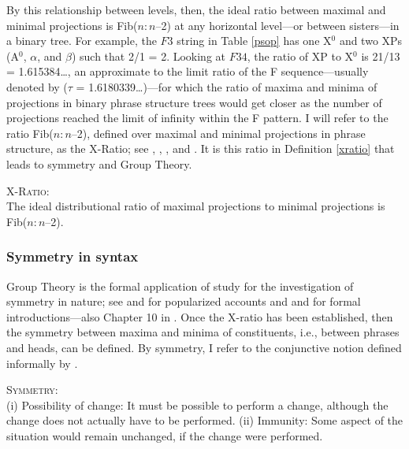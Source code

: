 \documentclass[11pt,twoside]{article}
\begin{document}
By this relationship between levels, then, the ideal ratio between maximal and minimal projections is Fib($n : n$--2) at any horizontal level---or between sisters---in a binary tree. For example, the $F3$ string in Table \ref{psop} has one X$^{0}$ and two XPs (A$^{0}$, $\alpha$, and $\beta$) such that 2/1 = 2. Looking at $F34$, the  ratio of XP to X$^{0}$ is 21/13 = 1.615384\dots, an approximate to the limit ratio of the F sequence---usually denoted by ($\tau$ = 1.6180339\dots)---for which the ratio of maxima and minima of projections in binary phrase structure trees would get closer as the number of projections reached the limit of infinity within the F pattern. I will refer to the ratio Fib($n : n$--2), defined over maximal and minimal projections in phrase structure, as the X-Ratio; see \cite{cm:2005}, \cite{bcm:2006}, \cite{medeiros:2008}, and \cite{soschen:2008}. It is this ratio in Definition \ref{xratio} that leads to symmetry and Group Theory.

\begin{definition}
\textsc{X-Ratio:}\\ 
The ideal distributional ratio of maximal projections to minimal projections is\\ \mbox{Fib($n : n$--2)}.\label{xratio}
\end{definition}


\subsubsection{Symmetry in syntax}
Group Theory is the formal application of study for the investigation of symmetry in nature; see \cite{livio:2005} and \cite{stewart:2007} for popularized accounts and \cite{rosen:1995} and \cite{milne:2008} for formal introductions---also Chapter 10 in \cite{pmw:1990}. Once the X-ratio has been established, then the symmetry between maxima and minima of constituents, i.e., between phrases and heads, can be defined. By symmetry, I refer to the conjunctive notion defined informally by \cite{rosen:1995}. 


\begin{definition}
\textsc{Symmetry:}\\
(i) Possibility of change:  
It must be possible to perform a change, although the change does not actually have to be performed.
(ii) Immunity: 
Some aspect of the situation would remain unchanged, if the change were performed. 
\end{definition}
\end{document}
